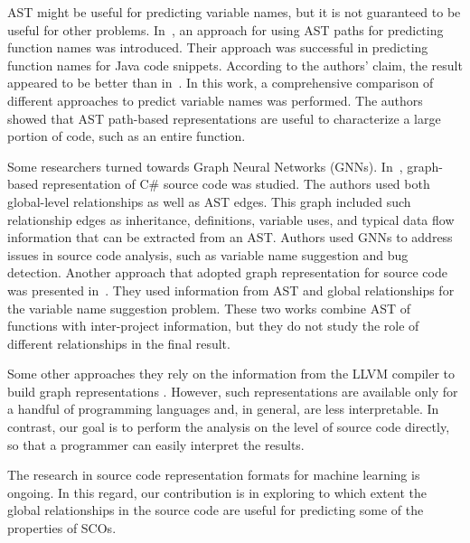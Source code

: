 \documentclass[a4paper,twoside]{article}
\begin{document}
AST might be useful for predicting variable names, but it is not guaranteed to be useful for other problems. In~\cite{Alon2018}, an approach for using AST paths for predicting function names was introduced. Their approach was successful in predicting function names for Java code snippets. According to the authors' claim, the result appeared to be better than in~\cite{Raychev2015}. In this work, a comprehensive comparison of different approaches to predict variable names was performed. The authors showed that AST path-based representations are useful to characterize a large portion of code, such as an entire function. 

Some researchers turned towards Graph Neural Networks (GNNs). In~\cite{Allamanis2017}, graph-based representation of C\# source code was studied. The authors used both global-level relationships as well as AST edges. This graph included such relationship edges as inheritance, definitions, variable uses, and typical data flow information that can be extracted from an AST\@. Authors used GNNs to address issues in source code analysis, such as variable name suggestion and bug detection. 
Another approach that adopted graph representation for source code was presented in~\cite{Cvitkovic2018}. They used information from AST and global relationships for the variable name suggestion problem. These two works combine AST of functions with inter-project information, but they do not study the role of different relationships in the final result. 

Some other approaches they rely on the information from the LLVM compiler to build graph representations \cite{Ben-Nun2018} \cite{Brauckmann2020}. However, such representations are available only for a handful of programming languages and, in general, are less interpretable. In contrast, our goal is to perform the analysis on the level of source code directly, so that a programmer can easily interpret the results. 

The research in source code representation formats for machine learning is ongoing. In this regard, our contribution is in exploring to which extent the global relationships in the source code are useful for predicting some of the properties of SCOs.
\end{document}
